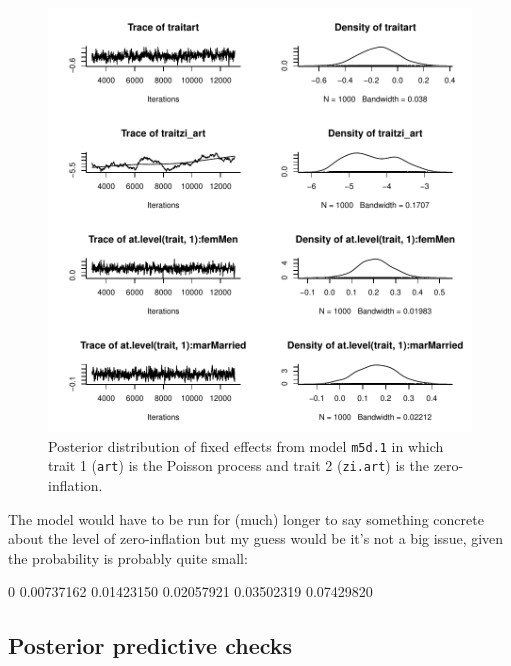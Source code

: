\documentclass{article}
\begin{document}
\begin{figure}[!h]
\begin{center}
\includegraphics{Lecture5-039}
\end{center}
\caption{Posterior distribution of fixed effects from model \texttt{m5d.1} in which trait 1 (\texttt{art}) is the Poisson process and trait 2 (\texttt{zi.art}) is the zero-inflation.}
\label{ZIP}
\end{figure}

The model would have to be run for (much) longer to say something concrete about the level of zero-inflation but my guess would be it's not a big issue, given the probability is probably quite small:

\begin{Schunk}
\begin{Soutput}
        0%
0.00737162 0.01423150 0.02057921 0.03502319 0.07429820 
\end{Soutput}
\end{Schunk}

\subsection{Posterior predictive checks}
\end{document}
